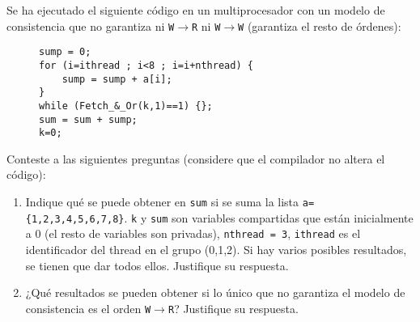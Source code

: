 \begin{ejercicio}
    Se ha ejecutado el siguiente código en un multiprocesador con un modelo de consistencia que no garantiza ni \verb|W|$\to$\verb|R| ni \verb|W|$\to$\verb|W| (garantiza el resto de órdenes):
    \begin{figure}[H]
        \centering
        \begin{verbatim}
sump = 0;
for (i=ithread ; i<8 ; i=i+nthread) {
    sump = sump + a[i];
}
while (Fetch_&_Or(k,1)==1) {};
sum = sum + sump;
k=0;
        \end{verbatim}
    \end{figure}
    Conteste a las siguientes preguntas (considere que el compilador no altera el código):
    \begin{enumerate}
        \item Indique qué se puede obtener en \verb|sum| si se suma la lista \verb|a={1,2,3,4,5,6,7,8}|. \verb|k| y \verb|sum| son variables compartidas que están inicialmente a 0 (el resto de variables son privadas), \verb|nthread = 3|, \verb|ithread| es el identificador del thread en el grupo (0,1,2). Si hay varios posibles resultados, se tienen que dar todos ellos. Justifique su respuesta.
        \item ¿Qué resultados se pueden obtener si lo único que no garantiza el modelo de consistencia es el orden
        \verb|W|$\to$\verb|R|? Justifique su respuesta.
    \end{enumerate}


\end{ejercicio}
